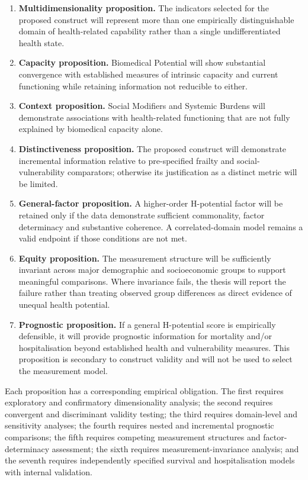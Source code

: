 \begin{enumerate}
    \item \textbf{Multidimensionality proposition.} The indicators selected for the proposed construct will represent more than one empirically distinguishable domain of health-related capability rather than a single undifferentiated health state.
    \item \textbf{Capacity proposition.} Biomedical Potential will show substantial convergence with established measures of intrinsic capacity and current functioning while retaining information not reducible to either.
    \item \textbf{Context proposition.} Social Modifiers and Systemic Burdens will demonstrate associations with health-related functioning that are not fully explained by biomedical capacity alone.
    \item \textbf{Distinctiveness proposition.} The proposed construct will demonstrate incremental information relative to pre-specified frailty and social-vulnerability comparators; otherwise its justification as a distinct metric will be limited.
    \item \textbf{General-factor proposition.} A higher-order H-potential factor will be retained only if the data demonstrate sufficient commonality, factor determinacy and substantive coherence. A correlated-domain model remains a valid endpoint if those conditions are not met.
    \item \textbf{Equity proposition.} The measurement structure will be sufficiently invariant across major demographic and socioeconomic groups to support meaningful comparisons. Where invariance fails, the thesis will report the failure rather than treating observed group differences as direct evidence of unequal health potential.
    \item \textbf{Prognostic proposition.} If a general H-potential score is empirically defensible, it will provide prognostic information for mortality and/or hospitalisation beyond established health and vulnerability measures. This proposition is secondary to construct validity and will not be used to select the measurement model.
\end{enumerate}

Each proposition has a corresponding empirical obligation. The first requires exploratory and confirmatory dimensionality analysis; the second requires convergent and discriminant validity testing; the third requires domain-level and sensitivity analyses; the fourth requires nested and incremental prognostic comparisons; the fifth requires competing measurement structures and factor-determinacy assessment; the sixth requires measurement-invariance analysis; and the seventh requires independently specified survival and hospitalisation models with internal validation.

